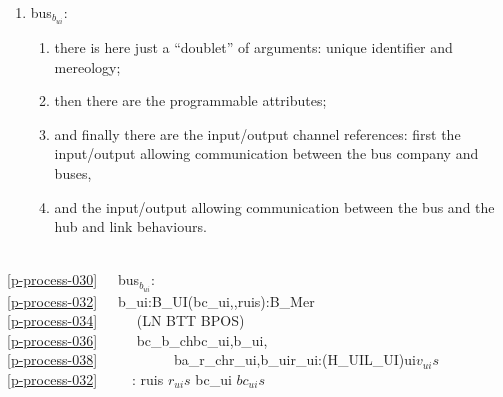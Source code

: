 {\begin{enumerate}\setei
\item \label{p-process-030} \textsf{bus$_{b_{ui}}$}:
\begin{enumerate}
\item \label{p-process-032} there is here just a ``doublet''  of
                          arguments: unique identifier and mereology;
\item \label{p-process-034} then there are the programmable attributes;
\item \label{p-process-036} and finally there are the input/output
                          channel references: first the input/output
                          allowing communication between 
                          the bus company and buses,
\item \label{p-process-038} and the  input/output allowing communication between
                          the bus and the hub and link behaviours.
\end{enumerate}
\savei\end{enumerate}\footsize\sf\HHHH
\pos{\psno}{\mnewfoil}
\bp
{}\\
\ref{p-process-030}\ \ \ bus$_{b_{ui}}$:\\
\ref{p-process-032}\ \ \ b\_ui:B\_UI{\TIMES}(bc\_ui,{\UNDERLINE},ruis):B\_Mer\\
\ref{p-process-034}\ \ \ \ \ {\RIGHTARROW} (LN {\TIMES} BTT {\TIMES} BPOS) \\
\ref{p-process-036}\ \ \ \ \ {\RIGHTARROW}  bc\_b\_ch{\LBRACKET}bc\_ui,b\_ui{\RBRACKET}, \\
\ref{p-process-038}\ \ \ \ \ \ \ \ \ \ \ {\LBRACE}ba\_r\_ch{\LBRACKET}r\_ui,b\_ui{\RBRACKET}{\BAR}r\_ui:(H\_UI{\BAR}L\_UI){\RDOT}ui{\ISIN}$v_{ui}s${\RBRACE} \\
\ref{p-process-032}\ \ \ \ \ : ruis {\EQ} $r_{ui}s$ {\WEDGE} bc\_ui {\ISIN} $bc_{ui}s$
\ep
\pos{\psno}{\mnewfoil}

}
